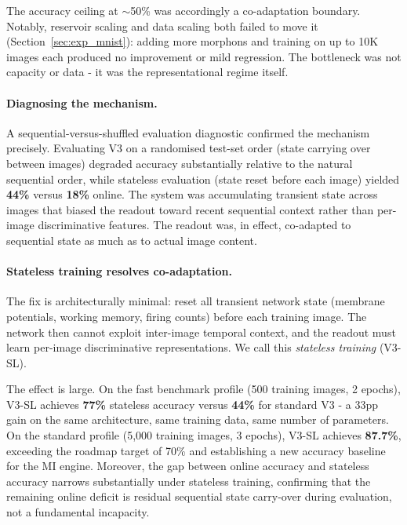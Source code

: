 The accuracy ceiling at $\sim$50\% was accordingly a co-adaptation boundary. Notably, reservoir scaling and data scaling both failed to move it (Section~\ref{sec:exp_mnist}): adding more morphons and training on up to 10K images each produced no improvement or mild regression. The bottleneck was not capacity or data - it was the representational regime itself.

\paragraph{Diagnosing the mechanism.}
A sequential-versus-shuffled evaluation diagnostic confirmed the mechanism precisely. Evaluating V3 on a randomised test-set order (state carrying over between images) degraded accuracy substantially relative to the natural sequential order, while stateless evaluation (state reset before each image) yielded \textbf{44\%} versus \textbf{18\%} online. The system was accumulating transient state across images that biased the readout toward recent sequential context rather than per-image discriminative features. The readout was, in effect, co-adapted to sequential state as much as to actual image content.

\paragraph{Stateless training resolves co-adaptation.}
The fix is architecturally minimal: reset all transient network state (membrane potentials, working memory, firing counts) before each training image. The network then cannot exploit inter-image temporal context, and the readout must learn per-image discriminative representations. We call this \emph{stateless training} (V3-SL).

The effect is large. On the fast benchmark profile (500 training images, 2 epochs), V3-SL achieves \textbf{77\%} stateless accuracy versus \textbf{44\%} for standard V3 - a 33pp gain on the same architecture, same training data, same number of parameters. On the standard profile (5{,}000 training images, 3 epochs), V3-SL achieves \textbf{87.7\%}, exceeding the roadmap target of 70\% and establishing a new accuracy baseline for the MI engine. Moreover, the gap between online accuracy and stateless accuracy narrows substantially under stateless training, confirming that the remaining online deficit is residual sequential state carry-over during evaluation, not a fundamental incapacity.

